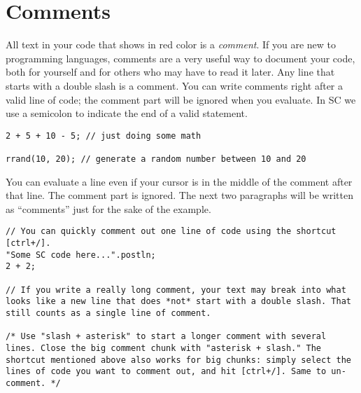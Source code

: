 \section{Comments}

All text in your code that shows in red color is a \emph{comment}. If you are new to programming languages, comments are a very useful way to document your code, both for yourself and for others who may have to read it later. Any line that starts with a double slash is a comment. You can write comments right after a valid line of code; the comment part will be ignored when you evaluate. In SC we use a semicolon to indicate the end of a valid statement.

\begin{lstlisting}[style=SuperCollider-IDE, basicstyle=\scttfamily\footnotesize]
2 + 5 + 10 - 5; // just doing some math

rrand(10, 20); // generate a random number between 10 and 20
\end{lstlisting}

You can evaluate a line even if your cursor is in the middle of the comment after that line. The comment part is ignored. The next two paragraphs will be written as ``comments'' just for the sake of the example.

 
\begin{lstlisting}[style=SuperCollider-IDE, basicstyle=\scttfamily\footnotesize]
// You can quickly comment out one line of code using the shortcut [ctrl+/].
"Some SC code here...".postln;
2 + 2;

// If you write a really long comment, your text may break into what looks like a new line that does *not* start with a double slash. That still counts as a single line of comment.

/* Use "slash + asterisk" to start a longer comment with several lines. Close the big comment chunk with "asterisk + slash." The shortcut mentioned above also works for big chunks: simply select the lines of code you want to comment out, and hit [ctrl+/]. Same to un-comment. */
\end{lstlisting}